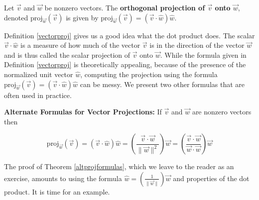 \colorbox{ResultColor}{\bbm

\begin{defn} \label{vectorproj} Let $\vec{v}$ and $\vec{w}$ be nonzero vectors.  The \textbf{orthogonal projection of $\vec{v}$ onto $\vec{w}$}, denoted $\text{proj}_{\vec{w}}(\vec{v})$ is given by $\text{proj}_{\vec{w}}(\vec{v}) = (\vec{v} \cdot \hat{w}) \hat{w}$.


\end{defn}
\ebm}

\smallskip

Definition \ref{vectorproj} gives us a good idea what the dot product does.  The scalar $\vec{v} \cdot \hat{w}$ is a measure of how much of the vector $\vec{v}$ is in the direction of the vector $\vec{w}$ and is thus called the scalar projection of $\vec{v}$ onto $\vec{w}$.  While the formula given in Definition \ref{vectorproj} is theoretically appealing, because of the presence of the normalized unit vector $\hat{w}$, computing the projection using the formula $\text{proj}_{\vec{w}}(\vec{v}) = (\vec{v} \cdot \hat{w}) \hat{w}$ can be messy.  We present two other formulas that are often used in practice.

\smallskip

\colorbox{ResultColor}{\bbm

\begin{thm} \label{altprojformulas} \textbf{Alternate Formulas for Vector Projections:}  If $\vec{v}$ and $\vec{w}$ are nonzero vectors then

\[\text{proj}_{\vec{w}}(\vec{v}) = (\vec{v} \cdot \hat{w}) \hat{w} = \left(\dfrac{\vec{v} \cdot \vec{w}}{\| \vec{w}\|^2}\right) \vec{w} = \left(\dfrac{\vec{v} \cdot \vec{w}}{\vec{w} \cdot \vec{w}}\right) \vec{w} \]

\end{thm}
\ebm}

\smallskip

The proof of Theorem \ref{altprojformulas}, which we leave to the reader as an exercise, amounts to using the formula $\hat{w} = \left(\frac{1}{\| \vec{w} \|}\right) \vec{w}$ and properties of the dot product.  It is time for an example.


